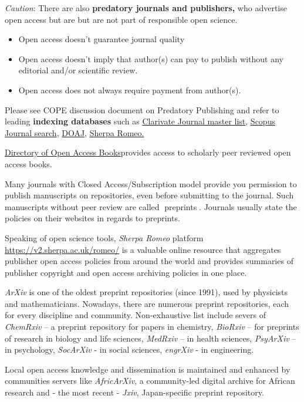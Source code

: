 \documentclass[
  letterpaper,
  DIV=11,
  numbers=noendperiod]{scrreport}
\providecommand{\tightlist}{%
  \setlength{\itemsep}{0pt}\setlength{\parskip}{0pt}}\usepackage{longtable,booktabs,array}
\begin{document}
\emph{Caution}: There are also \textbf{predatory journals and
publishers, }who advertise open access but are but are not part of
responsible open science.

\begin{itemize}
\tightlist
\item
  Open access doesn't guarantee journal quality
\item
  Open access doesn't imply that author(s) can pay to publish without
  any editorial and/or scientific review.
\item
  Open access does not always require payment from author(s).
\end{itemize}

Please see COPE discussion document on Predatory Publishing and refer to
leading \textbf{indexing databases} such as
\href{https://mjl.clarivate.com/home}{Clarivate Journal master list},
\href{https://www.scimagojr.com/journalsearch.php}{Scopus Journal
search}, \href{https://doaj.org/}{DOAJ},
\href{https://v2.sherpa.ac.uk/romeo/}{Sherpa Romeo.}

\href{https://www.doabooks.org/}{Directory of Open Access Books}provides
access to scholarly peer reviewed open access books.

Many journals with Closed Access/Subscription model provide you
permission to publish manuscripts on repositories, even before
submitting to the journal. Such manuscripts without peer review are
called {📖}preprints{📖}. Journals usually state the policies on their
websites in regards to preprints.

Speaking of open science tools, \emph{Sherpa Romeo} platform
\url{https://v2.sherpa.ac.uk/romeo/} is a valuable online resource that
aggregates publisher open access policies from around the world and
provides summaries of publisher copyright and open access archiving
policies in one place.

\emph{ArXiv} is one of the oldest preprint repositories (since 1991),
used by physicists and mathematicians. Nowadays, there are numerous
preprint repositories, each for every discipline and community.
Non-exhaustive list include severs of \emph{ChemRxiv} -- a preprint
repository for papers in chemistry, \emph{BioRxiv} -- for preprints of
research in biology and life sciences, \emph{MedRxiv} -- in health
sciences, \emph{PsyArXiv} -- in psychology, \emph{SocArXiv} - in social
sciences, \emph{engrXiv} - in engineering.

Local open access knowledge and dissemination is maintained and enhanced
by communities servers like \emph{AfricArXiv}, a community-led digital
archive for African research and - the most recent - \emph{Jxiv},
Japan-specific preprint repository.
\end{document}

